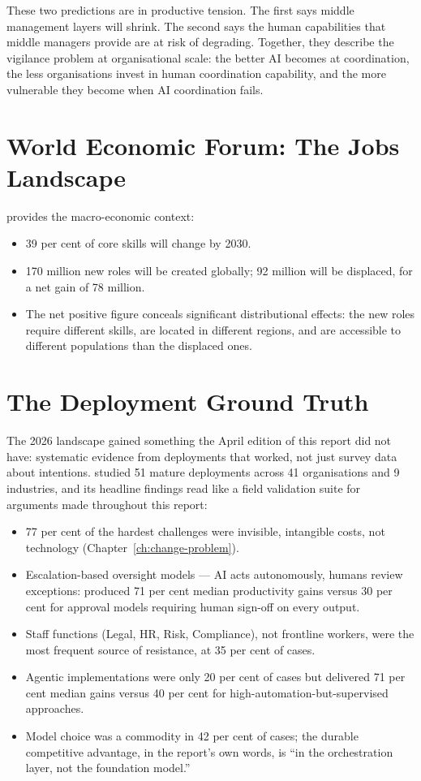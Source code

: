 These two predictions are in productive tension. The first says middle management layers will shrink. The second says the human capabilities that middle managers provide are at risk of degrading. Together, they describe the vigilance problem at organisational scale: the better AI becomes at coordination, the less organisations invest in human coordination capability, and the more vulnerable they become when AI coordination fails.

\section{World Economic Forum: The Jobs Landscape}

\textcite{WEF2025} provides the macro-economic context:

\begin{itemize}
  \item 39 per cent of core skills will change by 2030.
  \item 170 million new roles will be created globally; 92 million will be displaced, for a net gain of 78 million.
  \item The net positive figure conceals significant distributional effects: the new roles require different skills, are located in different regions, and are accessible to different populations than the displaced ones.
\end{itemize}

\section{The Deployment Ground Truth}

The 2026 landscape gained something the April edition of this report did not have: systematic evidence from deployments that worked, not just survey data about intentions. \textcite{Pereira2026Playbook} studied 51 mature deployments across 41 organisations and 9 industries, and its headline findings read like a field validation suite for arguments made throughout this report:

\begin{itemize}
  \item 77 per cent of the hardest challenges were invisible, intangible costs, not technology (Chapter~\ref{ch:change-problem}).
  \item Escalation-based oversight models --- AI acts autonomously, humans review exceptions: produced 71 per cent median productivity gains versus 30 per cent for approval models requiring human sign-off on every output.
  \item Staff functions (Legal, HR, Risk, Compliance), not frontline workers, were the most frequent source of resistance, at 35 per cent of cases.
  \item Agentic implementations were only 20 per cent of cases but delivered 71 per cent median gains versus 40 per cent for high-automation-but-supervised approaches.
  \item Model choice was a commodity in 42 per cent of cases; the durable competitive advantage, in the report's own words, is ``in the orchestration layer, not the foundation model.''
\end{itemize}

